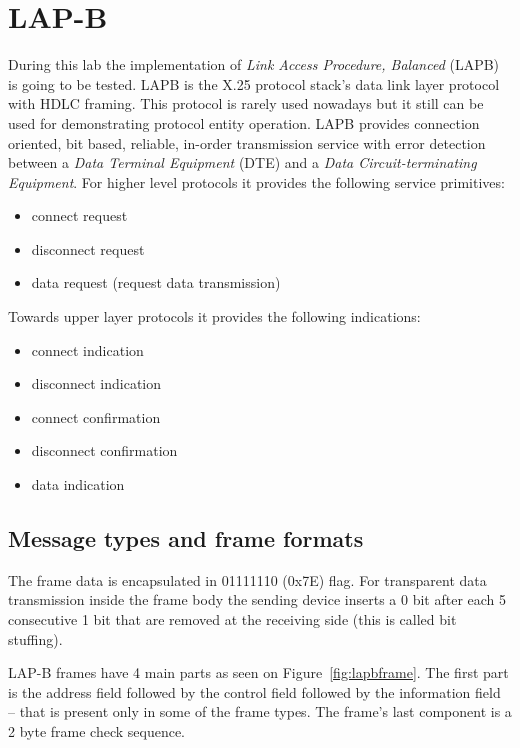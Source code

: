 \documentclass[a4paper]{article}
\begin{document}
\section{LAP-B}

During this lab the implementation of  \emph{Link Access Procedure, Balanced} (LAPB) is going to be tested. LAPB is the
X.25 protocol stack's data link layer protocol with HDLC framing. This protocol is rarely used nowadays but it still
can be used for demonstrating protocol entity operation. LAPB provides connection oriented, bit based, reliable,
in-order transmission service with error detection between a \emph{Data Terminal Equipment} (DTE) and a \emph{Data
    Circuit-terminating Equipment}. For higher level protocols it provides the following service primitives:
\begin{itemize}
    \item connect request
    \item disconnect request
    \item data request (request data transmission)
\end{itemize}
Towards upper layer protocols it provides the following indications:
\begin{itemize}
    \item connect indication
    \item disconnect indication
    \item connect confirmation
    \item disconnect confirmation
    \item data indication
\end{itemize}

\subsection{Message types and frame formats}

The frame data is encapsulated in 01111110 (0x7E) flag. For transparent data transmission inside the frame body the
sending device inserts a 0 bit after each 5 consecutive 1 bit that are removed at the receiving side (this is called
bit
stuffing).

LAP-B frames have 4 main parts as seen on Figure~\ref{fig:lapbframe}. The first part is the address field followed by
the control field followed by the information field -- that is present only in some of the frame types. The frame's
last component is a 2 byte frame check sequence.
\end{document}
